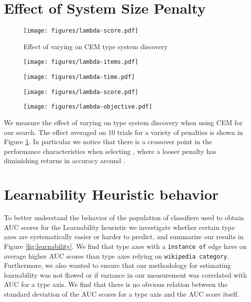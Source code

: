 \documentclass[letterpaper]{article}
\begin{document}
\section{Effect of System Size Penalty}
\label{section:lambdaexp}

\begin{figure}[ht]
\centering
\texttt{[image: figures/lambda-score.pdf]}
\caption{Effect of varying  on CEM type system discovery}
\label{fig:lambda}
\end{figure}

\begin{figure*}[ht]
\centering
\begin{subfigure}{0.24\linewidth}
    \texttt{[image: figures/lambda-items.pdf]}
    \caption{}
    \end{subfigure}
    \begin{subfigure}{0.24\linewidth}
    \texttt{[image: figures/lambda-time.pdf]}
    \caption{}
    \end{subfigure}
    \begin{subfigure}{0.24\linewidth}
    \texttt{[image: figures/lambda-score.pdf]}
    \caption{}
    \end{subfigure}
    \begin{subfigure}{0.24\linewidth}
    \texttt{[image: figures/lambda-objective.pdf]}
    \caption{}
    \end{subfigure}
    \caption{Effect of varying  on CEM type system discovery: Solution size (a) and iterations to convergence (b) grow exponentially with penalty decrease, while accuracy plateaus (c) around . Objective function increases as penalty decreases, since solution size is less penalized (d). Standard deviation is shown as the red region around the mean.}
    \label{fig:lambda}
\end{figure*}

We measure the effect of varying  on type system discovery when using CEM for our search. The effect averaged on 10 trials for a variety of  penalties is shown in Figure \ref{fig:lambda}. In particular we notice that there is a crossover point in the performance characteristics when selecting , where a looser penalty has diminishing returns in accuracy around .

\section{Learnability Heuristic behavior}
To better understand the behavior of the population of classifiers used to obtain AUC scores for the Learnability heuristic we investigate whether certain type axes are systematically easier or harder to predict, and summarize our results in Figure \ref{fig:learnability}. We find that type axes with a \texttt{instance of} edge have on average higher AUC scores than type axes relying on \texttt{wikipedia category}. Furthermore, we also wanted to ensure that our methodology for estimating learnability was not flawed or if variance in our measurement was correlated with AUC for a type axis. We find that there is no obvious relation between the standard deviation of the AUC scores for a type axis and the AUC score itself.
\end{document}
